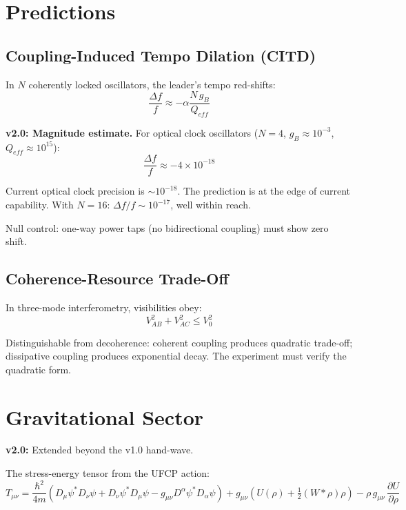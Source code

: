 \documentclass[11pt, a4paper]{article}
\begin{document}
\section{Predictions}

\subsection{Coupling-Induced Tempo Dilation (CITD)}

In $N$ coherently locked oscillators, the leader's tempo red-shifts:
\begin{equation}
  \frac{\Delta f}{f} \approx -\alpha \frac{N\, g_B}{Q_{eff}}
  \label{eq:citd}
\end{equation}

\textbf{v2.0: Magnitude estimate.} For optical clock oscillators
($N = 4$, $g_B \approx 10^{-3}$, $Q_{eff} \approx 10^{15}$):
\begin{equation}
  \frac{\Delta f}{f} \approx -4 \times 10^{-18}
\end{equation}

Current optical clock precision is $\sim 10^{-18}$. The prediction is at
the edge of current capability. With $N = 16$: $\Delta f/f \sim 10^{-17}$,
well within reach.

Null control: one-way power taps (no bidirectional coupling) must show
zero shift.

\subsection{Coherence-Resource Trade-Off}

In three-mode interferometry, visibilities obey:
\begin{equation}
  V_{AB}^2 + V_{AC}^2 \leq V_0^2
\end{equation}

Distinguishable from decoherence: coherent coupling produces quadratic
trade-off; dissipative coupling produces exponential decay. The experiment
must verify the quadratic form.

\section{Gravitational Sector}

\textbf{v2.0:} Extended beyond the v1.0 hand-wave.

The stress-energy tensor from the UFCP action:
\begin{equation}
  T_{\mu\nu} = \frac{\hbar^2}{4m}\left(
    D_\mu\psi^* D_\nu\psi + D_\nu\psi^* D_\mu\psi
    - g_{\mu\nu} D^\alpha\psi^* D_\alpha\psi
  \right)
  + g_{\mu\nu}\left(U(\rho) + \tfrac{1}{2}(W*\rho)\rho\right)
  - \rho\, g_{\mu\nu}\, \frac{\partial U}{\partial \rho}
  \label{eq:Tmunu}
\end{equation}
\end{document}
